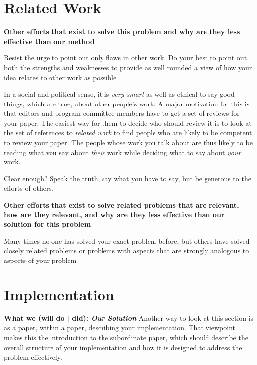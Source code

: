 \documentclass[pdf,bookmarks,colorlinks=true]{IEEEtran}
\begin{document}
\section{Related Work}
\label{sec:RelatedWork}

\textbf{Other efforts that exist to solve this problem and why are they
less effective than our method}

Resist the urge to point out only flaws in other work. Do your best to point
out both the strengths and weaknesses to provide as well rounded a view of how
your idea relates to other work as possible

In a social and political sense, it is {\em very smart} as well as ethical to
say good things, which are true, about other people's work. A major motivation
for this is that editors and program committee members have to get a set of
reviews for your paper. The easiest way for them to decide who should review it
is to look at the set of references to {\em related work} to find people who are likely to be competent to
review your paper.  The people whose work you talk about are thus likely to be
reading what you say about {\em their} work while deciding what to say about
{\em your} work.

Clear enough? Speak the truth, say what you have to say, but be generous to the
efforts of others.



\textbf{Other efforts that exist to solve related problems that are
relevant, how are they relevant, and why are they less effective than our
solution for this problem}

Many times no one has solved your exact problem before, but others have solved
closely related problems or problems with aspects that are strongly analogous
to aspects of your problem


\section{Implementation}
\label{sec:Implementation}

\textbf{What we (will do $|$ did): {\em Our Solution}}
Another way to look at this section is as a paper, within a paper,
describing your implementation. That viewpoint makes this the introduction to
the subordinate paper, which should describe the overall structure of your
implementation and how it is designed to address the problem effectively.
\end{document}
